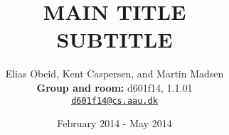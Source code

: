 \documentclass[a4paper, 12pt, twoside, article]{memoir}
\title{MAIN TITLE \\ SUBTITLE }
\author{Elias Obeid, Kent Caspersen, and Martin Madsen \\ \textbf{Group and room:} d601f14, 1.1.01\\ \href{mailto:d601f14@cs.aau.dk}{\texttt{d601f14@cs.aau.dk}}}
\date{February 2014 - May 2014}
\begin{document}
\frontmatter
\maketitle
\pagebreak
\mainmatter


\end{document}
